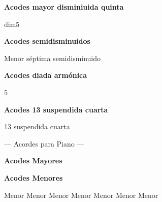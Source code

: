 \vskip 20pt
\textbf{Acodes mayor disminiuida quinta}

\small
{} dim5
\normalsize

\vskip 20pt
\textbf{Acodes semidisminuidos}

\small
{} Menor s\'eptima semidisminuido
\normalsize

\vskip 20pt
\textbf{Acodes diada arm\'onica}

\small
{} 5
\normalsize

\vskip 20pt
\textbf{Acodes 13 suspendida cuarta}

\small
{} 13 suspendida cuarta
\normalsize

\clearpage
\fi

\ifpiano
{}
{\parindent 8pt
        {\myTitleFont --- Acordes para Piano ---}}\par
\vskip 20pt
\textbf{Acodes Mayores}
\vskip 25pt

\small
{} \qquad\qquad {} \qquad\qquad {} \qquad\qquad {} \hfill \break
\vskip 25pt
 \qquad\qquad  {} \qquad\qquad {}
\vskip 25pt
 \qquad\qquad {} \qquad\qquad {} \qquad\qquad {} \hfill \break
\vskip 25pt
 \qquad\qquad {}
\normalsize

\textbf{Acodes Menores}
\vskip 25pt

\small
{} Menor \qquad\qquad {} Menor \qquad\qquad {} Menor \qquad\qquad {} Menor \hfill \break
\vskip 25pt
 Menor \qquad\qquad {} Menor \qquad\qquad {} Menor
\vskip 25pt
  \qquad\qquad  {}  \qquad\qquad  {} \qquad\qquad {} \hfill \break
\vskip 25pt
  \qquad\qquad  {}
\normalsize

